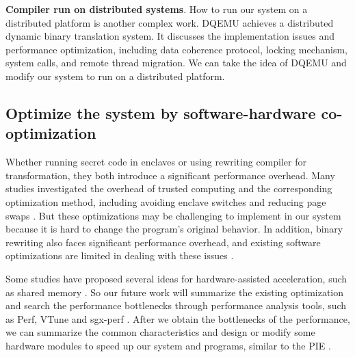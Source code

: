 \textbf{Compiler run on distributed systems}.
How to run our system on a distributed platform is another complex work.
DQEMU \cite{Zhao2020DQEMUAS} achieves a distributed dynamic binary translation system.
It discusses the implementation issues and performance optimization, including
data coherence protocol, locking mechanism, system calls, and remote thread migration.
We can take the idea of DQEMU and modify our system to run on a distributed platform.

\subsection{Optimize the system by software-hardware co-optimization}
\label{sec:ToolWithOptimization}
Whether running secret code in enclaves or using rewriting compiler for transformation,
they both introduce a significant performance overhead.
Many studies investigated the overhead of trusted computing and
the corresponding optimization method, including avoiding enclave switches
\cite{Tian2018SwitchlessCM} and reducing page swaps \cite{Orenbach2017EleosEO, Taassori2018VAULTRP}.
But these optimizations may be challenging to implement in our system because it is hard
to change the program's original behavior.
In addition, binary rewriting also faces significant performance overhead, and existing
software optimizations are limited in dealing with these issues \cite{Kim2003HardwareSF}.

Some studies have proposed several ideas for hardware-assisted acceleration, such as
shared memory \cite{Jiang2022CRONUSFS}.
So our future work will summarize the existing optimization and search the performance
bottlenecks through performance analysis tools, such as Perf, VTune and sgx-perf \cite{Weichbrodt2018sgxperfAP}.
After we obtain the bottlenecks of the performance, we can summarize the common characteristics
and design or modify some hardware modules to speed up our system and programs, similar to
the PIE \cite{Schneider2021PIEAP}.